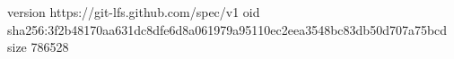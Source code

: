 version https://git-lfs.github.com/spec/v1
oid sha256:3f2b48170aa631dc8dfe6d8a061979a95110ec2eea3548bc83db50d707a75bcd
size 786528
